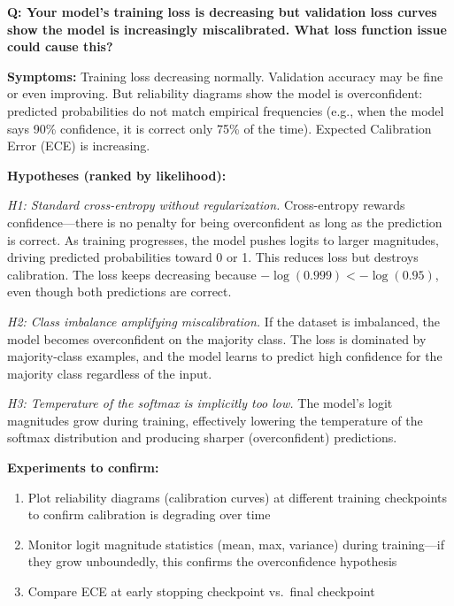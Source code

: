 \begin{interviewq}
\textbf{Q: Your model's training loss is decreasing but validation loss curves show the model is increasingly miscalibrated. What loss function issue could cause this?}

 \quad {} \quad \badgefreq{\freqmed}

\stronganswer

\textbf{Symptoms:} Training loss decreasing normally. Validation accuracy may be fine or even improving. But reliability diagrams show the model is overconfident: predicted probabilities do not match empirical frequencies (e.g., when the model says 90\% confidence, it is correct only 75\% of the time). Expected Calibration Error (ECE) is increasing.

\textbf{Hypotheses (ranked by likelihood):}

\textit{H1: Standard cross-entropy without regularization.} Cross-entropy rewards confidence---there is no penalty for being overconfident as long as the prediction is correct. As training progresses, the model pushes logits to larger magnitudes, driving predicted probabilities toward 0 or 1. This reduces loss but destroys calibration. The loss keeps decreasing because $-\log(0.999) < -\log(0.95)$, even though both predictions are correct.

\textit{H2: Class imbalance amplifying miscalibration.} If the dataset is imbalanced, the model becomes overconfident on the majority class. The loss is dominated by majority-class examples, and the model learns to predict high confidence for the majority class regardless of the input.

\textit{H3: Temperature of the softmax is implicitly too low.} The model's logit magnitudes grow during training, effectively lowering the temperature of the softmax distribution and producing sharper (overconfident) predictions.

\textbf{Experiments to confirm:}
\begin{enumerate}
    \item Plot reliability diagrams (calibration curves) at different training checkpoints to confirm calibration is degrading over time
    \item Monitor logit magnitude statistics (mean, max, variance) during training---if they grow unboundedly, this confirms the overconfidence hypothesis
    \item Compare ECE at early stopping checkpoint vs.\ final checkpoint
\end{enumerate}


\end{interviewq}
